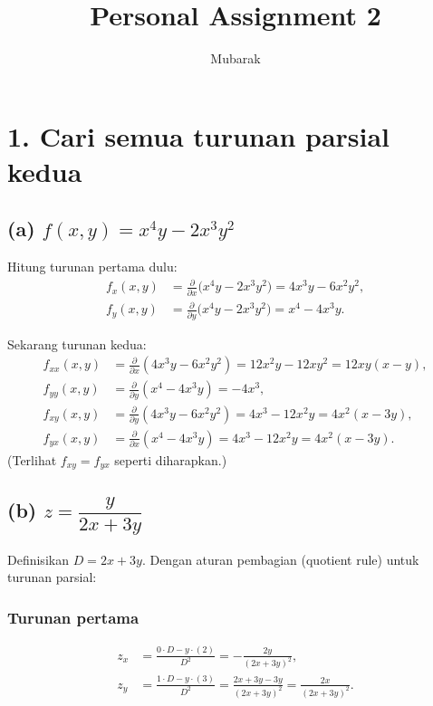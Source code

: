 \documentclass[12pt]{article}
\title{Personal Assignment 2}
\author{Mubarak}
\date{}
\begin{document}
\maketitle

\section*{1. Cari semua turunan parsial kedua}

\subsection*{(a) $f(x,y)=x^4 y - 2x^3 y^2$}

Hitung turunan pertama dulu:
\[
\begin{aligned}
f_x(x,y)&=\frac{\partial}{\partial x}\big(x^4 y - 2x^3 y^2\big)
=4x^3 y - 6x^2 y^2,\\[6pt]
f_y(x,y)&=\frac{\partial}{\partial y}\big(x^4 y - 2x^3 y^2\big)
=x^4 - 4x^3 y.
\end{aligned}
\]

Sekarang turunan kedua:
\[
\begin{aligned}
f_{xx}(x,y)&=\frac{\partial}{\partial x}(4x^3 y - 6x^2 y^2)
=12x^2 y - 12x y^2 = 12xy(x-y),\\[6pt]
f_{yy}(x,y)&=\frac{\partial}{\partial y}(x^4 - 4x^3 y)
=-4x^3,\\[6pt]
f_{xy}(x,y)&=\frac{\partial}{\partial y}(4x^3 y - 6x^2 y^2)
=4x^3 - 12x^2 y = 4x^2(x-3y),\\[6pt]
f_{yx}(x,y)&=\frac{\partial}{\partial x}(x^4 - 4x^3 y)
=4x^3 - 12x^2 y = 4x^2(x-3y).
\end{aligned}
\]
(Terlihat $f_{xy}=f_{yx}$ seperti diharapkan.)

\subsection*{(b) $z=\dfrac{y}{2x+3y}$}

Definisikan $D=2x+3y$. Dengan aturan pembagian (quotient rule) untuk turunan parsial:

\subsubsection*{Turunan pertama}
\[
\begin{aligned}
z_x &= \frac{0\cdot D - y\cdot(2)}{D^2} = -\frac{2y}{(2x+3y)^2}, \\[6pt]
z_y &= \frac{1\cdot D - y\cdot(3)}{D^2}
= \frac{2x+3y-3y}{(2x+3y)^2}
= \frac{2x}{(2x+3y)^2}.
\end{aligned}
\]
\end{document}
